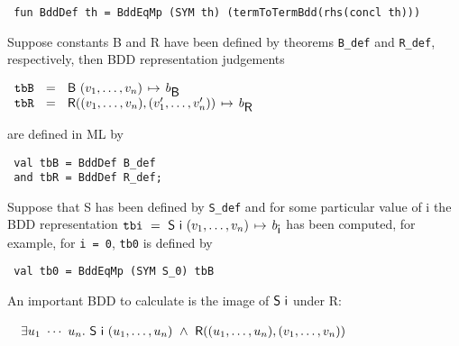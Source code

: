 \documentclass[12pt]{article}
\newcommand{\con}[1]{\mbox{\sf #1}}
\newcommand{\ml}[1]{{\tt #1}}
\newcommand{\globtermbdd}[2]{\mbox{$#1\hspace{0.5mm}\mapsto\hspace{0.5mm}#2$}}
\begin{document}
\vspace*{-1mm}

\begin{verbatim}
 fun BddDef th = BddEqMp (SYM th) (termToTermBdd(rhs(concl th)))
\end{verbatim}

\vspace*{-1mm}

Suppose constants \con{B} and \con{R} have been defined by theorems \ml{B\_def}
and \ml{R\_def}, respectively, then BDD representation judgements

\smallskip
$\begin{array}{l}
\ml{tbB}~~=~~\globtermbdd{\con{B}~(v_1,\ldots,v_n)}{b_{\con{B}}}\\
\ml{tbR}~~=~~\globtermbdd{\con{R}((v_1,\ldots,v_n),(v'_1,\ldots,v'_n))}{b_{\con{R}}}
\end{array}$
\smallskip

\noindent are defined in ML by

\vspace*{-1mm}

\begin{verbatim}
 val tbB = BddDef B_def
 and tbR = BddDef R_def;
\end{verbatim}

\vspace*{-1mm}

Suppose that \con{S} has been defined by \ml{S\_def} and for some
particular value of \con{i} the BDD representation
$\ml{tbi}~=~\globtermbdd{\con{S}~\con{i}~(v_1,\ldots,v_n)}{b_{\con{i}}}$
has been computed, for example, for \ml{\con{i} = 0}, \ml{tb0} is defined by

\vspace*{-1mm}

\begin{verbatim}
 val tb0 = BddEqMp (SYM S_0) tbB
\end{verbatim}

\vspace*{-1mm}

An important BDD to calculate is 
the image of $\con{S}~\con{i}$ under \con{R}:


\smallskip

~$\begin{array}{l}
\exists u_1~\cdots~u_n.~\con{S}~\con{i}~(u_1,\ldots,u_n)~\wedge~\con{R}((u_1,\ldots,u_n),(v_1,\ldots,v_n))
\end{array}
$

\smallskip
\end{document}
